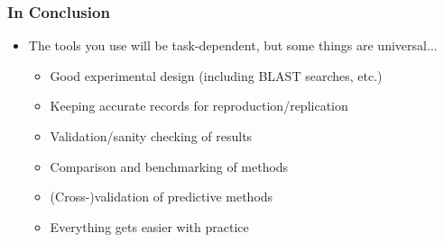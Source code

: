 \documentclass[table]{beamer}
\begin{document}
\begin{frame}[fragile]
\frametitle{In Conclusion}
\begin{center}
\begin{itemize}
\item The tools you use will be task-dependent, but some things are universal$\ldots$
\begin{itemize}
  \item Good experimental design (including BLAST searches, etc.)
  \item Keeping accurate records for reproduction/replication
  \item Validation/sanity checking of results
  \item Comparison and benchmarking of methods
  \item (Cross-)validation of predictive methods
  \item Everything gets easier with practice
\end{itemize}
\end{itemize}
\end{center}
\end{frame}


%
%
\end{document}
